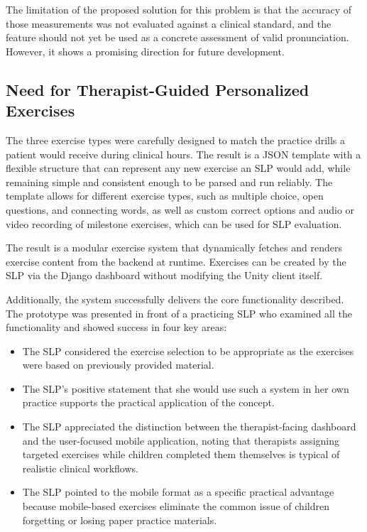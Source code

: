 The limitation of the proposed solution for this problem is that the accuracy of those measurements was not evaluated against a clinical standard, and the feature should not yet be used as a concrete assessment of valid pronunciation. However, it shows a promising direction for future development.

\subsection{Need for Therapist-Guided Personalized Exercises}
\label{subsec:need-for-therapist-guided-personalized-exercises}

The three exercise types were carefully designed to match the practice drills a patient would receive during clinical hours. The result is a JSON template with a flexible structure that can represent any new exercise an SLP would add, while remaining simple and consistent enough to be parsed and run reliably. The template allows for different exercise types, such as multiple choice, open questions, and connecting words, as well as custom correct options and audio or video recording of milestone exercises, which can be used for SLP evaluation.

The result is a modular exercise system that dynamically fetches and renders exercise content from the backend at runtime. Exercises can be created by the SLP via the Django dashboard without modifying the Unity client itself.

Additionally, the system successfully delivers the core functionality described. The prototype was presented in front of a practicing SLP who examined all the functionality and showed success in four key areas:

\begin{itemize}
    \item The SLP considered the exercise selection to be appropriate as the exercises were based on previously provided material.
    \item The SLP's positive statement that she would use such a system in her own practice supports the practical application of the concept.
    \item The SLP appreciated the distinction between the therapist-facing dashboard and the user-focused mobile application, noting that therapists assigning targeted exercises while children completed them themselves is typical of realistic clinical workflows.
    \item The SLP pointed to the mobile format as a specific practical advantage because mobile-based exercises eliminate the common issue of children forgetting or losing paper practice materials.
\end{itemize}

